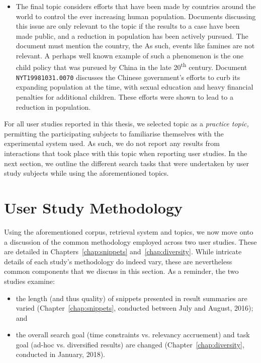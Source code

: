 \begin{itemize}
    \item{ The final topic considers efforts that have been made by countries around the world to control the ever increasing human population. Documents discussing this issue are only relevant to the topic if the results to a case have been made public, and a reduction in population has been actively pursued. The document must mention the country, the As such, events like famines are not relevant. A perhaps well known example of such a phenomenon is the one child policy that was pursued by China in the late 20\textsuperscript{th} century. Document \texttt{NYT19981031.0070} discusses the Chinese government's efforts to curb its expanding population at the time, with sexual education and heavy financial penalties for additional children. These efforts were shown to lead to a reduction in population.}
    
\end{itemize}

\vspace*{-3mm}
For all user studies reported in this thesis, we selected topic  as a \emph{practice topic,} permitting the participating subjects to familiarise themselves with the experimental system used. As such, we do not report any results from interactions that took place with this topic when reporting user studies. In the next section, we outline the different search tasks that were undertaken by user study subjects while using the aforementioned topics.

\section{User Study Methodology}\label{sec:methodology:user}
Using the aforementioned corpus, retrieval system and topics, we now move onto a discussion of the common methodology employed across two user studies. These are detailed in Chapters~\ref{chap:snippets} and~\ref{chap:diversity}. While intricate details of each study's methodology do indeed vary, these are nevertheless common components that we discuss in this section. As a reminder, the two studies examine:

\begin{itemize}
    \item{the length (and thus quality) of snippets presented in result summaries are varied (Chapter~\ref{chap:snippets}, conducted between July and August, 2016); and}

    \item{the overall search goal (time constraints vs. relevancy accruement) and task goal (ad-hoc vs. diversified results) are changed (Chapter~\ref{chap:diversity}, conducted in January, 2018).}
\end{itemize}
\vspace*{-4mm}


